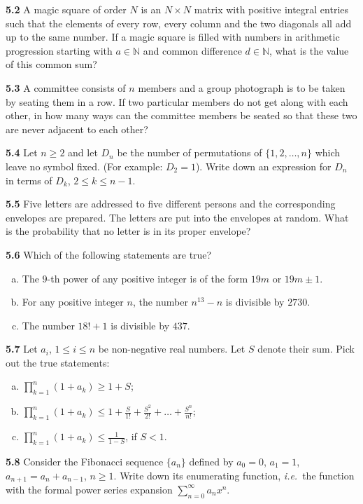 \documentclass[11pt,a4paper]{article}
\newcommand{\N}{\mathbb{N}}
\newcommand{\qitem}[1]{\par\medskip\noindent\textbf{#1}\hspace{0.5em}}
\begin{document}
\qitem{5.2} A magic square of order $N$ is an $N \times N$ matrix with positive integral entries such that the elements of every row, every column and the two diagonals all add up to the same number. If a magic square is filled with numbers in arithmetic progression starting with $a \in \N$ and common difference $d \in \N$, what is the value of this common sum?

\qitem{5.3} A committee consists of $n$ members and a group photograph is to be taken by seating them in a row. If two particular members do not get along with each other, in how many ways can the committee members be seated so that these two are never adjacent to each other?

\qitem{5.4} Let $n \ge 2$ and let $D_n$ be the number of permutations of $\{1, 2, \dots, n\}$ which leave no symbol fixed. (For example: $D_2 = 1$). Write down an expression for $D_n$ in terms of $D_k$, $2 \le k \le n - 1$.

\qitem{5.5} Five letters are addressed to five different persons and the corresponding envelopes are prepared. The letters are put into the envelopes at random. What is the probability that no letter is in its proper envelope?

\qitem{5.6} Which of the following statements are true?
\begin{enumerate}[a.]
  \item The $9$-th power of any positive integer is of the form $19m$ or $19m \pm 1$.
  \item For any positive integer $n$, the number $n^{13} - n$ is divisible by $2730$.
  \item The number $18! + 1$ is divisible by $437$.
\end{enumerate}

\qitem{5.7} Let $a_i$, $1 \le i \le n$ be non-negative real numbers. Let $S$ denote their sum. Pick out the true statements:
\begin{enumerate}[a.]
  \item $\prod_{k=1}^{n} (1 + a_k) \ge 1 + S$;
  \item $\prod_{k=1}^{n} (1 + a_k) \le 1 + \frac{S}{1!} + \frac{S^2}{2!} + \dots + \frac{S^n}{n!}$;
  \item $\prod_{k=1}^{n} (1 + a_k) \le \frac{1}{1 - S}$, if $S < 1$.
\end{enumerate}

\qitem{5.8} Consider the Fibonacci sequence $\{a_n\}$ defined by $a_0 = 0$, $a_1 = 1$, $a_{n+1} = a_n + a_{n-1}$, $n \ge 1$. Write down its enumerating function, \emph{i.e.}\ the function with the formal power series expansion $\sum_{n=0}^{\infty} a_n x^n$.
\end{document}
